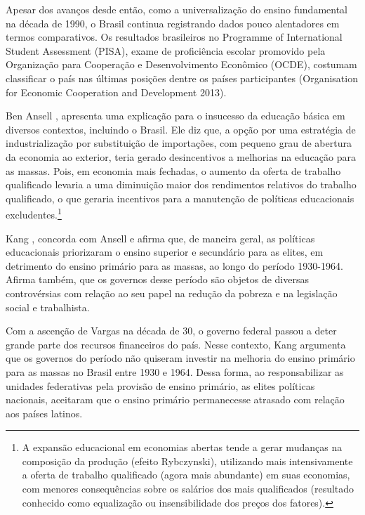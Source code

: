 \documentclass[a4paper,12pt]{article}
\begin{document}
\begin{citacao}
    Apesar dos avanços desde então, como a universalização do ensino fundamental na década de 1990, o Brasil continua registrando dados pouco alentadores em termos comparativos. Os resultados brasileiros no Programme of International Student Assessment (PISA), exame de proficiência escolar promovido pela Organização para Cooperação e Desenvolvimento Econômico (OCDE), costumam classificar o país nas últimas posições dentre os países participantes (Organisation for Economic Cooperation and Development 2013). \cite{kang}
\end{citacao}

Ben Ansell \cite*{ansell_2010}, apresenta uma explicação para o insucesso da educação básica em diversos contextos, incluindo o Brasil.
Ele diz que, a opção por uma estratégia de industrialização por substituição de importações, com pequeno grau de abertura da economia ao exterior, teria gerado desincentivos a melhorias na educação para as massas.
Pois, em economia mais fechadas, o aumento da oferta de trabalho qualificado levaria a uma diminuição maior dos rendimentos relativos do trabalho qualificado, o que geraria incentivos para a manutenção de políticas educacionais excludentes.\footnote{A expansão educacional em economias abertas tende a gerar mudanças na composição da produção (efeito Rybczynski), utilizando mais intensivamente a oferta de trabalho qualificado (agora mais abundante) em suas economias, com menores consequências sobre os salários dos mais qualificados (resultado conhecido como equalização ou insensibilidade dos preços dos fatores).}

Kang \cite*{kang}, concorda com Ansell e afirma que, de maneira geral, as políticas educacionais
priorizaram o ensino superior e secundário para as elites, em detrimento do ensino primário para as massas, ao longo do período 1930-1964.
Afirma também, que os governos desse período são objetos de diversas controvérsias com relação ao seu papel na redução da pobreza e na legislação social e trabalhista.

Com a ascenção de Vargas na década de 30, o governo federal passou a deter grande parte dos recursos financeiros do país. Nesse contexto, Kang \cite*{kang} argumenta que os governos do período não quiseram investir na melhoria do ensino primário para as massas no Brasil entre 1930 e 1964.
Dessa forma, ao responsabilizar as unidades federativas pela provisão de ensino primário, as elites políticas nacionais, aceitaram que o ensino primário permanecesse atrasado com relação aos países latinos.
\end{document}
